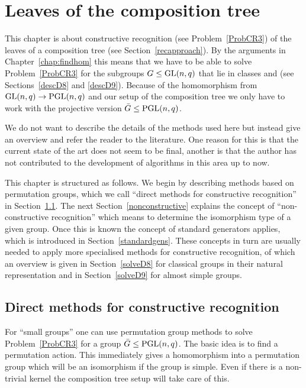 
\chapter{Leaves of the composition tree}
\label{chap:leaves}
%

This chapter is about constructive recognition (see
Problem~\ref{ProbCR3}) of the leaves of a
composition tree (see Section~\ref{recapproach}). By the arguments in
Chapter~\ref{chap:findhom} this means that we have to be
able to solve Problem~\ref{ProbCR3} for the subgroups $G \le \GL(n,q)$
that lie in classes  and  (see Sections~\ref{descD8} and
\ref{descD9}). Because of the homomorphism from $\GL(n,q) \to
\PGL(n,q)$ and our setup of the composition tree we only have
to work with the projective version $\bar G \le \PGL(n,q)$.

We do not want to describe the details of the methods used here but
instead give an overview and refer the reader to the literature.
One reason for this is that the current state of the art does not seem
to be final, another is that the author has not contributed to the
development of algorithms in this area up to now.

This chapter is structured as follows. We begin by describing
methods based on permutation groups, which we call ``direct methods
for constructive recognition'' in Section~\ref{solvedirect}. The
next Section~\ref{nonconstructive} explains the concept of
``non-constructive recognition'' which means to determine
the isomorphism type of a given group. Once this is known the
concept of standard generators applies, which is introduced in
Section~\ref{standardgens}. These concepts in turn are usually needed to apply
more specialised methods for constructive recognition, of which an
overview is given in Section~\ref{solveD8} for classical groups in
their natural representation and in
Section~\ref{solveD9} for almost simple groups.

\section{Direct methods for constructive recognition}
\label{solvedirect}

For ``small groups'' one can use permutation group methods to solve
Problem~\ref{ProbCR3} for a group $\bar G \le \PGL(n,q)$. The basic idea is
to find a permutation action. This immediately gives a homomorphism
into a permutation group which will be an isomorphism if the group is
simple. Even if there is a non-trivial kernel the composition tree setup
will take care of this.

